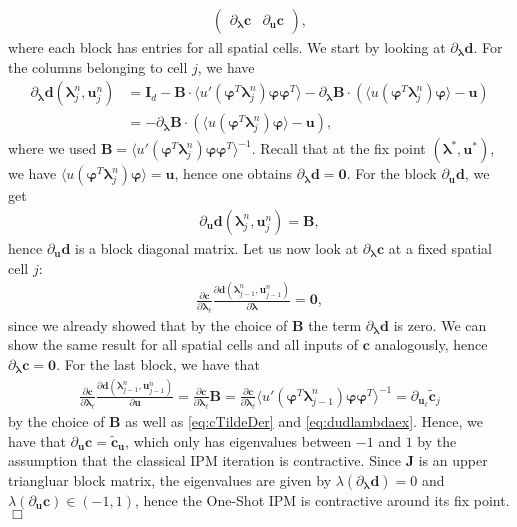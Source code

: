 \documentclass[10pt, a4paper, titlepage, bibliography=totocnumbered]{article}
\newenvironment{proof}[1][Proof]{\begin{trivlist}
\item[\hskip \labelsep {\bfseries #1}]}{\end{trivlist}}
\newcommand{\qed}{\hfill \ensuremath{\Box}}
\begin{document}
\begin{proof}
\begin{align}
\begin{pmatrix}
\partial_{\bm{\lambda}} \bm{c} & \partial_{\bm{u}} \bm{c}
\end{pmatrix},
\end{align}
where each block has entries for all spatial cells. We start by looking at $\partial_{\bm{\lambda}} \bm{d}$. For the columns belonging to cell $j$, we have
\begin{align*}
\partial_{\bm{\lambda}} \bm{d}(\bm{\lambda}_j^n,\bm{u}_j^n) &= \bm{I}_d - \bm{B} \cdot \langle u'(\bm{\varphi}^T\bm{\lambda}_j^n)\bm{\varphi}\bm{\varphi}^T \rangle - \partial_{\bm{\lambda}}\bm{B} \cdot \left( \langle u(\bm{\varphi}^T\bm{\lambda}_j^n)\bm{\varphi} \rangle - \bm{u}\right) \\
&=- \partial_{\bm{\lambda}}\bm{B} \cdot \left( \langle u(\bm{\varphi}^T\bm{\lambda}_j^n)\bm{\varphi} \rangle - \bm{u}\right),
\end{align*}
where we used $\bm{B} = \langle u'(\bm{\varphi}^T\bm{\lambda}_j^n)\bm{\varphi}\bm{\varphi}^T \rangle^{-1}$. Recall that at the fix point $(\bm{\lambda}^*,\bm{u}^*)$, we have $\langle u(\bm{\varphi}^T\bm{\lambda}_j^n)\bm{\varphi} \rangle = \bm{u}$, hence one obtains $\partial_{\bm{\lambda}} \bm{d}=\bm{0}$. For the block $\partial_{\bm{u}} \bm{d}$, we get 
\begin{align*}
\partial_{\bm{u}} \bm{d}(\bm{\lambda}_j^n,\bm{u}_j^n) = \bm{B},
\end{align*}
hence $\partial_{\bm{u}} \bm{d}$ is a block diagonal matrix. Let us now look at $\partial_{\bm{\lambda}} \bm{c}$ at a fixed spatial cell $j$:
\begin{align*}
\frac{\partial \bm{c}}{\partial \bm{\lambda}_{\ell}}\frac{\partial \bm{d}(\bm{\lambda}_{j-1}^{n},\bm{u}_{j-1}^{n})}{\partial \bm{\lambda}} = \bm{0},
\end{align*}
since we already showed that by the choice of $\bm{B}$ the term $\partial_{\bm{\lambda}} \bm{d}$ is zero. We can show the same result for all spatial cells and all inputs of $\bm{c}$ analogously, hence $\partial_{\bm{\lambda}} \bm{c} = \bm{0}$. For the last block, we have that 
\begin{align*}
\frac{\partial \bm{c}}{\partial \bm{\lambda}_{\ell}}\frac{\partial \bm{d}(\bm{\lambda}_{j-1}^{n},\bm{u}_{j-1}^{n})}{\partial \bm{u}} = \frac{\partial \bm{c}}{\partial \bm{\lambda}_{\ell}} \bm{B} = \frac{\partial \bm{c}}{\partial \bm{\lambda}_{\ell}} \langle u'(\bm{\varphi}^T\bm{\lambda}_{j-1}^n)\bm{\varphi}\bm{\varphi}^T \rangle^{-1} = \partial_{\bm{u}_{\ell}}\bm{\tilde c}_j
\end{align*}
by the choice of $\bm{B}$ as well as \eqref{eq:cTildeDer} and \eqref{eq:dudlambdaex}. Hence, we have that $\partial_{\bm{u}} \bm{c} = \bm{\tilde c}_{\bm{u}}$, which only has eigenvalues between $-1$ and $1$ by the assumption that the classical IPM iteration is contractive. Since $\bm{J}$ is an upper triangluar block matrix, the eigenvalues are given by $\lambda\left(\partial_{\bm{\lambda}} \bm{d}\right) = 0$ and $\lambda\left(\partial_{\bm{u}} \bm{c}\right)\in(-1,1)$, hence the One-Shot IPM is contractive around its fix point.\qed
\end{proof}
\end{document}
